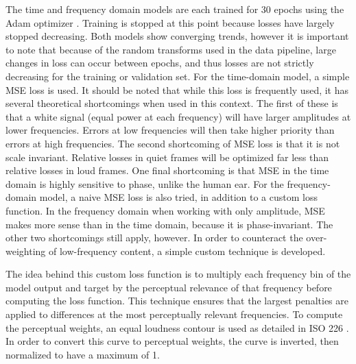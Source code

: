  The time and frequency domain models are each trained for 30 epochs using the Adam optimizer . Training is stopped at this point because losses have largely stopped decreasing. Both models show converging trends, however it is important to note that because of the random transforms used in the data pipeline, large changes in loss can occur between epochs, and thus losses are not strictly decreasing for the training or validation set. For the time-domain model, a simple \ac{MSE} loss is used. It should be noted that while this loss is frequently used, it has several theoretical shortcomings when used in this context. The first of these is that a white signal (equal power at each frequency) will have larger amplitudes at lower frequencies. Errors at low frequencies will then take higher priority than errors at high frequencies. The second shortcoming of \ac{MSE} loss is that it is not scale invariant. Relative losses in quiet frames will be optimized far less than relative losses in loud frames. One final shortcoming is that \ac{MSE} in the time domain is highly sensitive to phase, unlike the human ear. For the frequency-domain model, a naive \ac{MSE} loss is also tried, in addition to a custom loss function. In the frequency domain when working with only amplitude, \ac{MSE} makes more sense than in the time domain, because it is phase-invariant. The other two shortcomings still apply, however. In order to counteract the over-weighting of low-frequency content, a simple custom technique is developed.  

The idea behind this custom loss function is to multiply each frequency bin of the model output and target by the perceptual relevance of that frequency before computing the loss function. This technique ensures that the largest penalties are applied to differences at the most perceptually relevant frequencies. To compute the perceptual weights, an equal loudness contour is used as detailed in ISO 226 . In order to convert this curve to perceptual weights, the curve is inverted, then normalized to have a maximum of 1.
